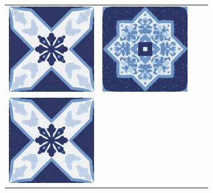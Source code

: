 \documentclass{oci}
\begin{document}
\begin{problemDescription}
\begin{figure}[h]
\begin{subfigure}{0.45\textwidth}
\begin{center}
{\begin{tabular}{cccc}
        \includegraphics[scale=0.3]{b.eps} &
        \includegraphics[scale=0.3]{a.eps} \\
        \includegraphics[scale=0.3]{b.eps} &

\end{tabular}}
\end{center}
\end{subfigure}
\end{figure}
\end{problemDescription}
\end{document}
